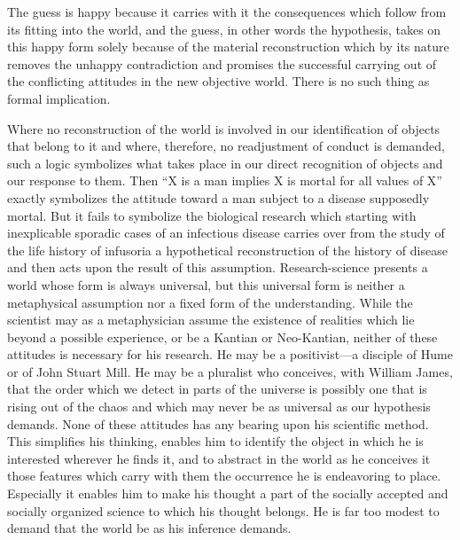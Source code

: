 \documentclass[12pt]{article}
\begin{document}
The guess is happy because it carries with it the consequences
which follow from its fitting into the world,
and the guess, in other words the hypothesis, takes on
this happy form solely because of the material reconstruction
which by its nature removes the unhappy
contradiction and promises the successful carrying out
of the conflicting attitudes in the new objective world.
There is no such thing as formal implication.


Where no reconstruction of the world is involved in
our identification of objects that belong to it and
where, therefore, no readjustment of conduct is demanded,
such a logic symbolizes what takes place in
our direct recognition of objects and our response
to them. Then ``X is a man implies X is mortal for
all values of X'' exactly symbolizes the attitude toward
a man subject to a disease supposedly mortal. But
it fails to symbolize the biological research which starting
with inexplicable sporadic cases of an infectious
disease carries over from the study of the life history
of infusoria a hypothetical reconstruction of the history
of disease and then acts upon the result of this
assumption. Research-science presents a world whose
form is always universal, but this universal form is
neither a metaphysical assumption nor a fixed form of
the understanding. While the scientist may as a metaphysician
assume the existence of realities which lie
beyond a possible experience, or be a Kantian or Neo-Kantian,
neither of these attitudes is necessary for his
research. He may be a positivist—a disciple of Hume
or of John Stuart Mill. He may be a pluralist who
conceives, with William James, that the order which
we detect in parts of the universe is possibly one that
is rising out of the chaos and which may never be as
universal as our hypothesis demands. None of these
attitudes has any bearing upon his scientific method.
This simplifies his thinking, enables him to identify the
object in which he is interested wherever he finds it, and
to abstract in the world as he conceives it those features
which carry with them the occurrence he is endeavoring
to place. Especially it enables him to make his thought
a part of the socially accepted and socially organized
science to which his thought belongs. He is far too
modest to demand that the world be as his inference
demands.
\end{document}
